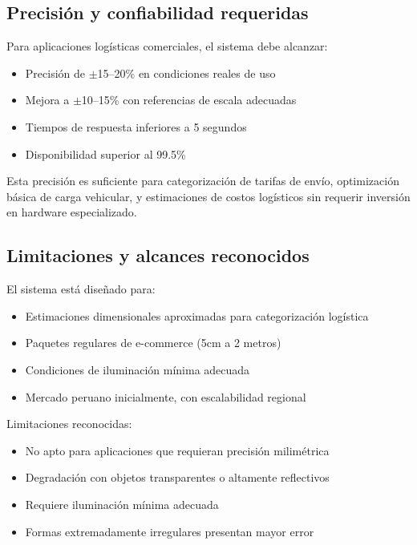 \subsection{Precisión y confiabilidad requeridas}

Para aplicaciones logísticas comerciales, el sistema debe alcanzar:

\begin{itemize}
    \item Precisión de $\pm$15--20\% en condiciones reales de uso
    \item Mejora a $\pm$10--15\% con referencias de escala adecuadas
    \item Tiempos de respuesta inferiores a 5 segundos
    \item Disponibilidad superior al 99.5\%
\end{itemize}

Esta precisión es suficiente para categorización de tarifas de envío, optimización básica de carga vehicular, y estimaciones de costos logísticos sin requerir inversión en hardware especializado.

\subsection{Limitaciones y alcances reconocidos}

El sistema está diseñado para:

\begin{itemize}
    \item Estimaciones dimensionales aproximadas para categorización logística
    \item Paquetes regulares de e-commerce (5cm a 2 metros)
    \item Condiciones de iluminación mínima adecuada
    \item Mercado peruano inicialmente, con escalabilidad regional
\end{itemize}

Limitaciones reconocidas:

\begin{itemize}
    \item No apto para aplicaciones que requieran precisión milimétrica
    \item Degradación con objetos transparentes o altamente reflectivos
    \item Requiere iluminación mínima adecuada
    \item Formas extremadamente irregulares presentan mayor error
\end{itemize}